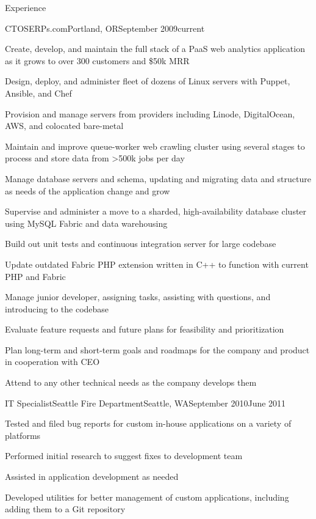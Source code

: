\documentclass[letterpaper,10pt]{article}
\begin{document}
\begin{res_section}{Experience}
\begin{res_experienceitem}{CTO}{SERPs.com}{Portland, OR}{September 2009}{current}
  \item Create, develop, and maintain the full stack of a PaaS web analytics application as it grows to over 300 customers and \$50k MRR
  \item Design, deploy, and administer fleet of dozens of Linux servers with Puppet, Ansible, and Chef
  \item Provision and manage servers from providers including Linode, DigitalOcean, AWS, and colocated bare-metal
  \item Maintain and improve queue-worker web crawling cluster using several stages to process and store data from \textgreater500k jobs per day
  \item Manage database servers and schema, updating and migrating data and structure as needs of the application change and grow
  \item Supervise and administer a move to a sharded, high-availability database cluster using MySQL Fabric and data warehousing
  \item Build out unit tests and continuous integration server for large codebase
  \item Update outdated Fabric PHP extension written in C++ to function with current PHP and Fabric
  \item Manage junior developer, assigning tasks, assisting with questions, and introducing to the codebase
  \item Evaluate feature requests and future plans for feasibility and prioritization
  \item Plan long-term and short-term goals and roadmaps for the company and product in cooperation with CEO
  \item Attend to any other technical needs as the company develops them
\end{res_experienceitem}
\begin{res_experienceitem}{IT Specialist}{Seattle Fire Department}{Seattle, WA}{September 2010}{June 2011}
  \item Tested and filed bug reports for custom in-house applications on a variety of platforms
  \item Performed initial research to suggest fixes to development team
  \item Assisted in application development as needed
  \item Developed utilities for better management of custom applications, including adding them to a Git repository

\end{res_experienceitem}
\end{res_section}
\end{document}
